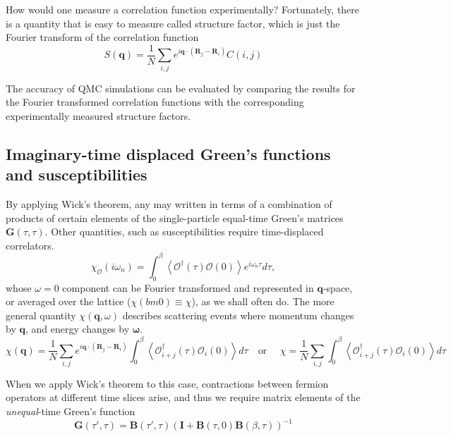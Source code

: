How would one measure a correlation function experimentally? Fortunately, there is a quantity that is easy to measure called structure factor, which is just the Fourier transform of the correlation function
\begin{equation}
S(\bm q) = \frac{1}{N} \sum_{i, j} e^{i\bm q \cdot (\bm R_j - \bm R_i) } C(i, j) 
\end{equation}

The accuracy of QMC simulations can be evaluated by comparing the results for the Fourier transformed correlation functions with the corresponding experimentally measured structure factors.

\subsection{Imaginary-time displaced Green's functions and susceptibilities}
\label{subsec:imtimedisp}

By applying Wick's theorem, any  may written in terms of a combination of products of certain elements of the single-particle equal-time Green's matrices $\bm G ( \tau, \tau )$.
Other  quantities, such as susceptibilities require time-displaced correlators.
\begin{equation}
\chi_{\mathcal{O}} ( i \omega_n ) = \int_0^\beta \left\langle \mathcal{O}^\dagger ( \tau ) \mathcal{O} ( 0 ) \right\rangle e^{i\omega_n \tau} d\tau ,
\end{equation}
whose $\omega =0$ component can be Fourier transformed and represented in $\bm q$-space, or averaged over the lattice ($\chi ( bm 0 ) \equiv \chi$), as we shall often do.
The more general quantity $\chi (\bm q, \omega)$ describes scattering events where momentum changes by $\bm q$, and energy changes by $\bm \omega$.
\begin{equation}
\chi ( \bm q ) = \frac{1}{N} \sum_{i, j} e^{i\bm q \cdot ( \bm R_j - \bm R_i )} \int_0^\beta \left\langle \mathcal{O}_{i + j}^\dagger ( \tau ) \mathcal{O}_i ( 0 ) \right\rangle d\tau \quad \text{or } \quad \chi = \frac{1}{N} \sum_{i, j} \int_0^\beta \left\langle \mathcal{O}_{i + j}^\dagger ( \tau ) \mathcal{O}_i ( 0 ) \right\rangle d\tau
\end{equation}

When we apply Wick's theorem to this case, contractions between fermion operators at different time slices arise, and thus we require matrix elements of the \emph{unequal}-time Green's function
\begin{equation}
\bm G ( \tau' , \tau ) = \bm B ( \tau', \tau ) ( \bm I + \bm B ( \tau, 0 ) \bm B ( \beta, \tau ) )^{-1}
\end{equation}

